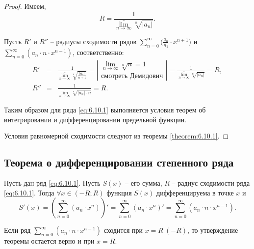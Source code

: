 \begin{proof}
    Имеем,
    \[
        R = \frac{1}{\underset{n\rightarrow\infty}{\overline{\lim}}\sqrt[n]{|a_n|}}.
    \]

    Пусть $R'$ и $R''$ -- радиусы сходимости рядов $\sum_{n=0}^{\infty}\big(\frac{a_n}{n_1} \cdot x^{n+1}\big)$ и \\ $\sum_{n=0}^{\infty}(a_n \cdot n \cdot x^{n-1})$, соответственно:
    \begin{eqnarray*}
        R' & = & \frac{1}{\underset{n\rightarrow\infty}{\overline{\lim}}\sqrt[n]{\frac{|a_n|}{n+1}}} = \left|\begin{array}{l}
            \underset{n\rightarrow\infty}{\lim}\sqrt[n]{n} = 1 \\
            \text{смотреть Демидович}
        \end{array}\right| = \frac{1}{\underset{n\rightarrow\infty}{\overline{\lim}}\sqrt[n]{| a_n | }} = R, \\
        R'' & = & \frac{1}{\underset{n\rightarrow\infty}{\overline{\lim}}\sqrt[n]{|a_n|\cdot n}} = R.
    \end{eqnarray*}

    Таким образом для ряда \ref{eq:6.10.1} выполняется условия теорем об интегрировании и дифференцировании предельной функции.

    Условия равномерной сходимости следуют из теоремы \ref{theorem:6.10.1}.
\end{proof}

\subsection{Теорема о дифференцировании степенного ряда}

\begin{theorem}
    Пусть дан ряд \ref{eq:6.10.1}. Пусть $S(x)$ -- его сумма, $R$ -- радиус сходимости ряда \ref{eq:6.10.1}. Тогда $\forall x \in (-R;R)$ функция $S(x)$ дифференцируема в точке $x$ и
    \[
        S'(x) = \left(\sum_{n=0}^{\infty}(a_n \cdot x^n)\right)' = \sum_{n=0}^{\infty}(a_n \cdot x^n)' = \sum_{n=0}^{\infty}(a_n \cdot n \cdot x^{n-1}).
    \]

    Если ряд $\sum_{n=0}^{\infty}(a_n \cdot n \cdot x^{n-1})$ сходится при $x = R \ (-R)$, то утверждение теоремы остается верно и при $x = R$.
\end{theorem}

